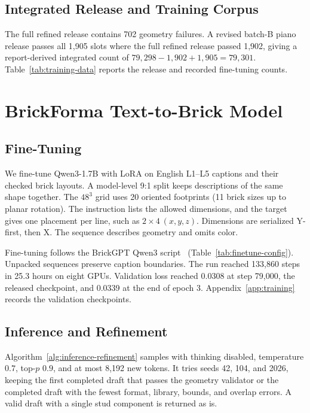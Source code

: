 \documentclass[letterpaper]{article} %
\begin{document}
\subsection{Integrated Release and Training Corpus}
The full refined release contains 702 geometry failures. A revised batch-B piano release passes all 1,905 slots where the full refined release passed 1,902, giving a report-derived integrated count of $79{,}298-1{,}902+1{,}905=79{,}301$. Table~\ref{tab:training-data} reports the release and recorded fine-tuning counts.


\section{BrickForma Text-to-Brick Model}
\label{sec:model}
\subsection{Fine-Tuning}
\label{sec:training}
We fine-tune Qwen3-1.7B with LoRA on English L1--L5 captions and their checked brick layouts. A model-level 9:1 split keeps descriptions of the same shape together. The $48^3$ grid uses 20 oriented footprints (11 brick sizes up to planar rotation). The instruction lists the allowed dimensions, and the target gives one placement per line, such as $2{\times}4\ (x,y,z)$. Dimensions are serialized Y-first, then X. The sequence describes geometry and omits color.

Fine-tuning follows the BrickGPT Qwen3 script~\cite{brickgpt} (Table~\ref{tab:finetune-config}). Unpacked sequences preserve caption boundaries. The run reached 133,860 steps in 25.3 hours on eight GPUs. Validation loss reached 0.0308 at step 79,000, the released checkpoint, and 0.0339 at the end of epoch 3. Appendix~\ref{app:training} records the validation checkpoints.


\subsection{Inference and Refinement}
Algorithm~\ref{alg:inference-refinement} samples with thinking disabled, temperature $0.7$, top-$p$ $0.9$, and at most 8,192 new tokens. It tries seeds 42, 104, and 2026, keeping the first completed draft that passes the geometry validator or the completed draft with the fewest format, library, bounds, and overlap errors. A valid draft with a single stud component is returned as is.
\end{document}

